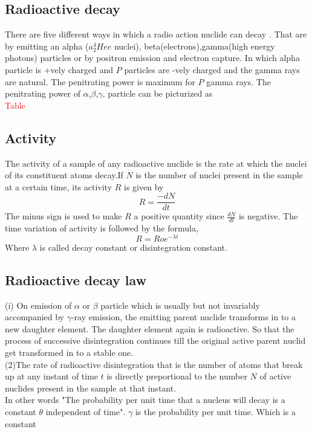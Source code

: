 \subsection{Radioactive decay}
There are five different ways in which a radio action nuclide can decay . That are by emitting an alpha ($a ^4_2Hee$ nuclei), beta(electrons),gamma(high energy photons) particles or by positron emission  and electron capture. In which alpha particle is +vely charged and $P$ particles are -vely charged and the gamma rays are natural. The penitrating power is maximum for $P$ gamma rays. The penitrating power of $\alpha$,$\beta$,$\gamma$, particle can be picturized as\\
\textcolor{red}{Table}\\
\subsection{Activity}
The activity of a sample of any radioactive nuclide is the rate at which the nuclei of its constituent atoms decay.If $N$ is the number of nuclei present in the sample at a certain time, its activity $R$ is given by
$$R=\frac{-dN}{dt}$$
The minus sign is used to make $R$ a positive quantity since $\frac{dN}{dt}$ is negative. The time variation of activity is followed by the formula, 
$$R=Roe^{-\lambda t}$$
Where $\lambda$ is called decay constant or disintegration constant.
\subsection{Radioactive decay law}
(i) \quad On emission of $\alpha$ or $\beta$ particle which is usually but not invariably accompanied by $\gamma$-ray emission, the emitting parent nuclide transforms in to a new daughter element. The daughter element again is radioactive. So that the process of successive disintegration continues till the original active parent nuclid get transformed in to a stable one.\\
(2)\quad The rate of radioactive disintegration that is the number of atoms that break up at any instant of time $t$ is directly preportional to the number $N$ of active nuclides present in the sample at that instant.\\
In other words "The probability per unit time that a nucleus will decay is a constant $\theta$ independent of time". $\gamma$ is the probability per unit time. Which is a constant \\
